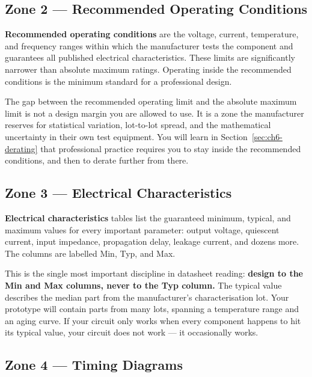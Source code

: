 \subsection{Zone 2 — Recommended Operating Conditions}
\label{sec:ch6-rec-op}

\textbf{Recommended operating conditions} are the voltage, current, temperature, and frequency ranges within which the manufacturer tests the component and guarantees all published electrical characteristics.
These limits are significantly narrower than absolute maximum ratings.
Operating inside the recommended conditions is the minimum standard for a professional design.

The gap between the recommended operating limit and the absolute maximum limit is not a design margin you are allowed to use.
It is a zone the manufacturer reserves for statistical variation, lot-to-lot spread, and the mathematical uncertainty in their own test equipment.
You will learn in Section~\ref{sec:ch6-derating} that professional practice requires you to stay inside the recommended conditions, and then to derate further from there.

\subsection{Zone 3 — Electrical Characteristics}
\label{sec:ch6-elec-char}

\textbf{Electrical characteristics} tables list the guaranteed minimum, typical, and maximum values for every important parameter: output voltage, quiescent current, input impedance, propagation delay, leakage current, and dozens more.
The columns are labelled Min, Typ, and Max.

This is the single most important discipline in datasheet reading: \textbf{design to the Min and Max columns, never to the Typ column.}
The typical value describes the median part from the manufacturer's characterisation lot.
Your prototype will contain parts from many lots, spanning a temperature range and an aging curve.
If your circuit only works when every component happens to hit its typical value, your circuit does not work --- it occasionally works.

\subsection{Zone 4 — Timing Diagrams}
\label{sec:ch6-timing}

